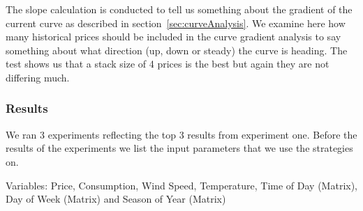The slope calculation is conducted to tell us something about the gradient of the current curve as described in section~\ref{sec:curveAnalysis}. We examine here how many historical prices should be included in the curve gradient analysis to say something about what direction (up, down or steady) the curve is heading. The test shows us that a stack size of 4 prices is the best but again they are not differing much.

\subsubsection{Results}
We ran 3 experiments reflecting the top 3 results from experiment one. Before the results of the experiments we list the input parameters that we use the strategies on. 

Variables: Price, Consumption, Wind Speed, Temperature, Time of Day (Matrix), Day of Week (Matrix) and Season of Year (Matrix)
\begin{table}[H]
\centering  %
\caption{Statistical results} %
\label{table:Statistical1} %
\end{table}

